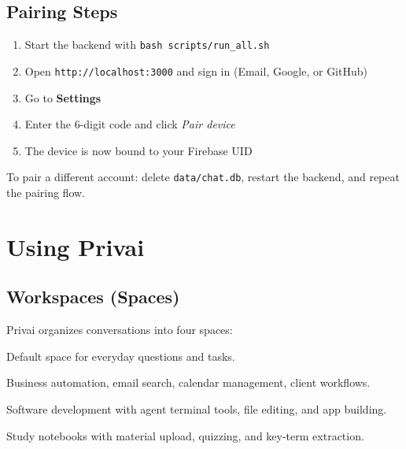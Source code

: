 \documentclass[a4paper,11pt,twoside]{report}
\begin{document}
\section{Pairing Steps}
\begin{enumerate}
  \item Start the backend with \texttt{bash scripts/run\_all.sh}
  \item Open \texttt{http://localhost:3000} and sign in (Email, Google, or GitHub)
  \item Go to \textbf{Settings}
  \item Enter the 6-digit code and click \emph{Pair device}
  \item The device is now bound to your Firebase UID
\end{enumerate}

\begin{infobox}[Re-pairing]
To pair a different account: delete \texttt{data/chat.db}, restart the backend, and repeat the pairing flow.
\end{infobox}

\chapter{Using Privai}

\section{Workspaces (Spaces)}
Privai organizes conversations into four spaces:

\begin{description}[leftmargin=2em]
  \item[General] Default space for everyday questions and tasks.
  \item[Business] Business automation, email search, calendar management, client workflows.
  \item[Coding] Software development with agent terminal tools, file editing, and app building.
  \item[Learning] Study notebooks with material upload, quizzing, and key-term extraction.
\end{description}
\end{document}
